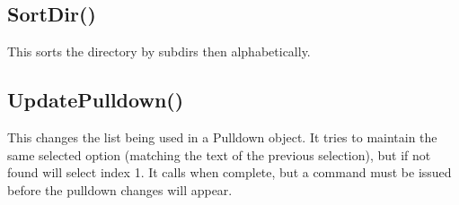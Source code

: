 \documentclass[letterpaper,10pt,english]{sphinxmanual}
\begin{document}
\begin{sphinxVerbatim}[commandchars=\\\{\}]
\end{sphinxVerbatim}

\ignorespaces 

\subsection{SortDir()}
\label{\detokenize{reference/ui:sortdir}}\label{\detokenize{reference/ui:index-30}}
\sphinxAtStartPar
{}

\sphinxAtStartPar
This sorts the directory by subdirs
then alphabetically.

\sphinxAtStartPar
{}

\begin{sphinxVerbatim}[commandchars=\\\{\}]
\end{sphinxVerbatim}

\ignorespaces 

\subsection{UpdatePulldown()}
\label{\detokenize{reference/ui:updatepulldown}}\label{\detokenize{reference/ui:index-31}}
\sphinxAtStartPar
{}

\sphinxAtStartPar
{}

\sphinxAtStartPar
This changes the list being used in a Pulldown object.  It tries to maintain the same selected option (matching the text of the previous selection), but if not found will select index 1. It calls  when complete, but a  command must be issued before the pulldown changes will appear.

\sphinxAtStartPar
{}

\begin{sphinxVerbatim}[commandchars=\\\{\}]
\end{sphinxVerbatim}
\end{document}
